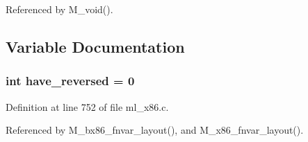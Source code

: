 Referenced by M\_\-void().

\subsection{Variable Documentation}
\subsubsection{\setlength{\rightskip}{0pt plus 5cm}int \bf{have\_\-reversed} = 0\hspace{0.3cm}{\tt  [static]}}\label{ml__x86_8c_32dfe108c6378f2e07f27a5203370dee}




Definition at line 752 of file ml\_\-x86.c.

Referenced by M\_\-bx86\_\-fnvar\_\-layout(), and M\_\-x86\_\-fnvar\_\-layout().